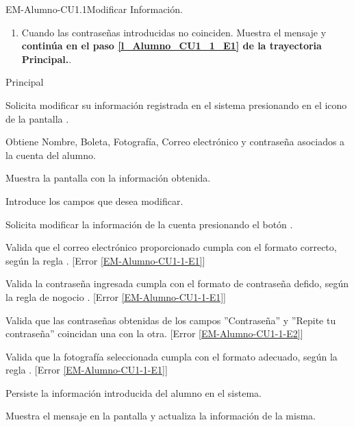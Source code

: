 \begin{UseCase}{EM-Alumno-CU1.1}{Modificar Información.}
{\begin{enumerate}
			\item \label{EM-Alumno-CU1-1-E2} Cuando las contraseñas introducidas no coinciden. Muestra el mensaje  y \textbf{continúa en el paso \ref{l_Alumno_CU1_1_E1} de la trayectoria Principal.}.
		\end{enumerate}
	}
\end{UseCase}

\begin{UCtrayectoria}{Principal}

	\UCpaso [\UCactor] Solicita modificar su información registrada en el sistema
	presionando en el icono  de la pantalla . 

	\UCpaso Obtiene Nombre, Boleta, Fotografía, Correo electrónico y contraseña
	asociados a la cuenta del alumno.

	\UCpaso Muestra la pantalla  con la información obtenida.

	\UCpaso[\UCactor] Introduce los campos que desea modificar. \label{l_Alumno_CU1_1_E1}

	\UCpaso [\UCactor] Solicita modificar la información de la cuenta
	presionando el botón .
	
	\UCpaso Valida que el correo electrónico proporcionado cumpla con el formato correcto, según la regla . [Error  \ref{EM-Alumno-CU1-1-E1}]

    \UCpaso Valida la contraseña ingresada cumpla con el formato de contraseña defido, según la regla de nogocio . [Error  \ref{EM-Alumno-CU1-1-E1}]

    \UCpaso Valida que las contraseñas obtenidas de los campos ''Contraseña'' y ''Repite tu contraseña'' coincidan una con la otra. [Error  \ref{EM-Alumno-CU1-1-E2}]

    \UCpaso Valida que la fotografía seleccionada cumpla con el formato adecuado, según la regla . [Error \ref{EM-Alumno-CU1-1-E1}]  

    \UCpaso Persiste la información introducida del alumno en el sistema. \label{l_EM_Alumno_CU1_1_PersisteInfo}

    \UCpaso Muestra el mensaje  en la pantalla
     y actualiza la
    información de la misma. 
     
\end{UCtrayectoria}

